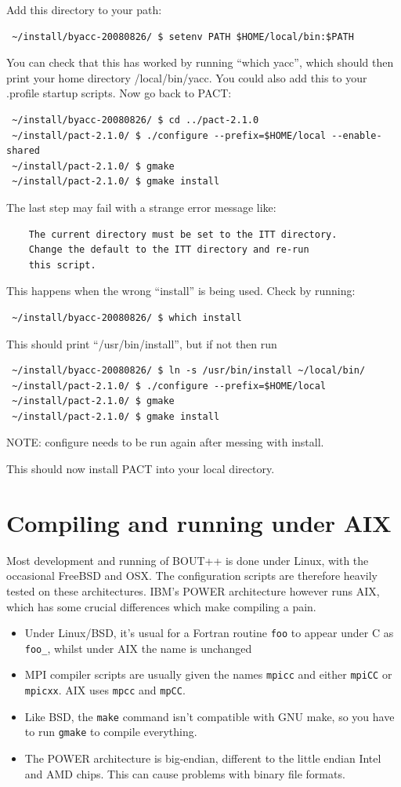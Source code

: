 \documentclass[12pt]{article}
\newcommand{\code}[1]{\texttt{#1}}
\begin{document}
Add this directory to your path:
%
\begin{verbatim}
 ~/install/byacc-20080826/ $ setenv PATH $HOME/local/bin:$PATH
\end{verbatim}
%
You can check that this has worked by running ``which yacc'', which should then
print your home directory /local/bin/yacc.  You could also add this to your
.profile startup scripts. Now go back to PACT:
%
\begin{verbatim}
 ~/install/byacc-20080826/ $ cd ../pact-2.1.0
 ~/install/pact-2.1.0/ $ ./configure --prefix=$HOME/local --enable-shared
 ~/install/pact-2.1.0/ $ gmake
 ~/install/pact-2.1.0/ $ gmake install
\end{verbatim}
%
The last step may fail with a strange error message like:
%
\begin{verbatim}
    The current directory must be set to the ITT directory.
    Change the default to the ITT directory and re-run
    this script.
\end{verbatim}
%
This happens when the wrong ``install'' is being used. Check by running:
%
\begin{verbatim}
 ~/install/byacc-20080826/ $ which install
\end{verbatim}
%
This should print ``/usr/bin/install'', but if not then run
%
\begin{verbatim}
 ~/install/byacc-20080826/ $ ln -s /usr/bin/install ~/local/bin/
 ~/install/pact-2.1.0/ $ ./configure --prefix=$HOME/local
 ~/install/pact-2.1.0/ $ gmake
 ~/install/pact-2.1.0/ $ gmake install
\end{verbatim}
%
NOTE: configure needs to be run again after messing with install.

This should now install PACT into your local directory.





\section{Compiling and running under AIX}
%
Most development and running of BOUT++ is done under Linux, with the occasional
FreeBSD and OSX.  The configuration scripts are therefore heavily tested on
these architectures. IBM's POWER architecture however runs AIX, which has some
crucial differences which make compiling a pain.

%
\begin{itemize}
\item Under Linux/BSD, it's usual for a Fortran routine \code{foo} to appear
    under C as \code{foo\_}, whilst under AIX the name is unchanged
\item MPI compiler scripts are usually given the names \code{mpicc} and
  either \code{mpiCC} or \code{mpicxx}. AIX uses \code{mpcc} and \code{mpCC}.
\item Like BSD, the \code{make} command isn't compatible with GNU make,
  so you have to run \code{gmake} to compile everything.
\item The POWER architecture is big-endian, different to the little endian
  Intel and AMD chips. This can cause problems with binary file formats.
\end{itemize}
%
\end{document}
